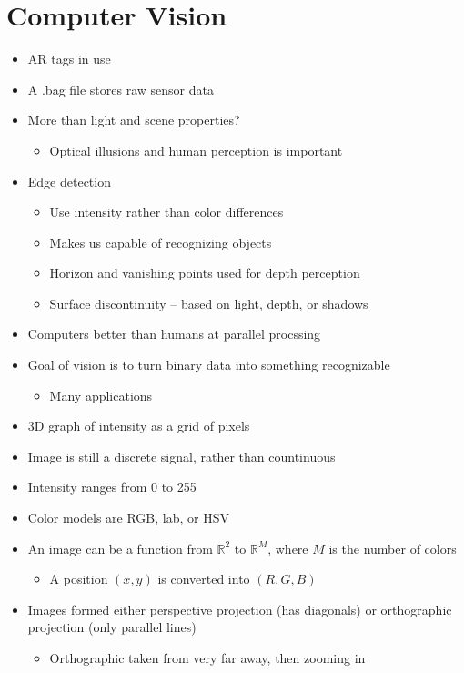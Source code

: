 \documentclass{article}
\begin{document}
\section*{Computer Vision}
\begin{itemize}
\item AR tags in use 
\item A .bag file stores raw sensor data 
\item More than light and scene properties? 
\begin{itemize}
\item Optical illusions and human perception is important 
\end{itemize}
\item Edge detection 
\begin{itemize}
\item Use intensity rather than color differences 
\item Makes us capable of recognizing objects 
\item Horizon and vanishing points used for depth perception 
\item Surface discontinuity – based on light, depth, or shadows 
\end{itemize}
\item Computers better than humans at parallel procssing 
\item Goal of vision is to turn binary data into something recognizable 
\begin{itemize}
\item Many applications 
\end{itemize}
\item 3D graph of intensity as a grid of pixels 
\item Image is still a discrete signal, rather than countinuous 
\item Intensity ranges from 0 to 255 
\item Color models are RGB, lab, or HSV 
\item An image can be a function from $\mathbb{R}^2$ to $\mathbb{R}^M$, where $M$ is the number of colors
\begin{itemize}
\item A position $(x,y)$ is converted into $(R,G,B)$
\end{itemize}
\item Images formed either perspective projection (has diagonals) or orthographic projection (only parallel lines) 
\begin{itemize}
\item Orthographic taken from very far away, then zooming in

\end{itemize}
\end{itemize}
\end{document}
